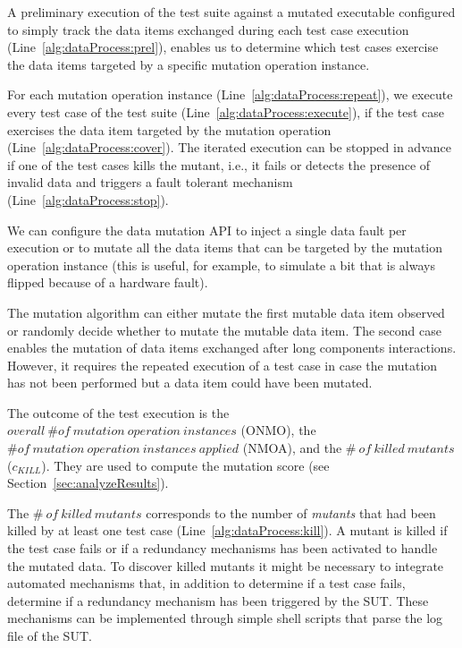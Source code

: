 A preliminary execution of the test suite against a mutated executable configured to simply track the data items exchanged during each test case execution (Line~\ref{alg:dataProcess:prel}), enables us to determine which test cases exercise the data items targeted by a specific mutation operation instance.

 For each mutation operation instance (Line~\ref{alg:dataProcess:repeat}), we execute every test case of the test suite (Line~\ref{alg:dataProcess:execute}), if the test case exercises the data item targeted by the mutation operation (Line~\ref{alg:dataProcess:cover}).
 The iterated execution can be stopped in advance if one of the test cases kills the mutant, i.e., it fails or detects the presence of invalid data and triggers a fault tolerant mechanism (Line~\ref{alg:dataProcess:stop}).
 
We can configure the data mutation API to inject a single data fault per execution or to mutate all the data items that can be targeted by the mutation operation instance (this is useful, for example, to simulate a bit that is always flipped because of a hardware fault).
 
The mutation algorithm can either mutate the first mutable data item observed or randomly decide whether to mutate the mutable data item. The second case enables the mutation of data items exchanged after long components interactions. However, it requires the repeated execution of a test case in case the mutation has not been performed but a data item could have been mutated. 


\newcommand{\ONMO}{\mathit{overall}\ \# \mathit{of}\ \mathit{mutation} \ \mathit{operation} \ \mathit{instances}}
\newcommand{\NMOA}{\# \mathit{of}\ \mathit{mutation} \ \mathit{operation}\ \mathit{instances} \ \mathit{applied}}


The outcome of the test execution is the $\ONMO$ (ONMO), the $\NMOA$ (NMOA), and the $\# \ \mathit{of}\ \mathit{killed} \ \mathit{mutants}$ ($c_{\mathit{KILL}}$). They are used to compute the mutation score (see Section~\ref{sec:analyzeResults}).

The $\# \ \mathit{of}\ \mathit{killed} \ \mathit{mutants}$ corresponds to the number of \emph{mutants} that had been killed by at least one test case (Line~\ref{alg:dataProcess:kill}). A mutant is killed if the test case fails or if a redundancy mechanisms has been activated to handle the mutated data. To discover killed mutants it might be necessary to integrate automated mechanisms that, in addition to determine if a test case fails, determine if a redundancy mechanism has been triggered by the SUT. These mechanisms can be implemented through simple shell scripts that parse the log file of the SUT.


